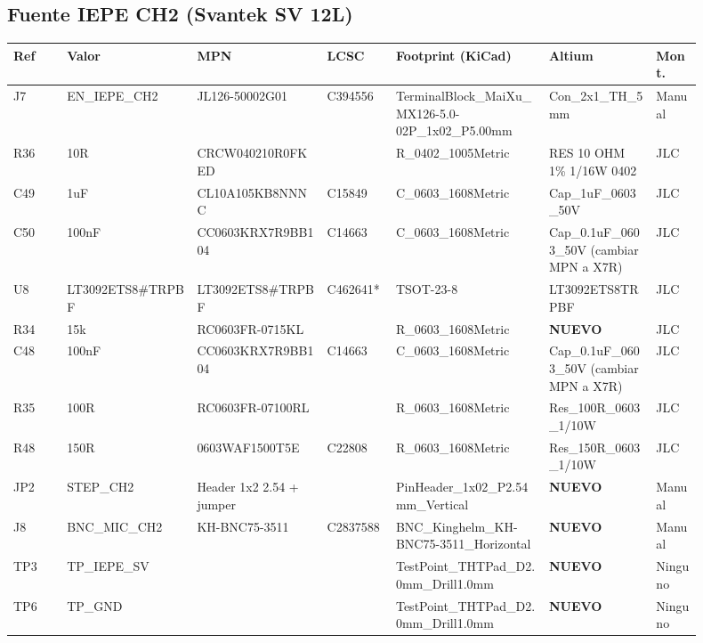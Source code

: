 \documentclass[10pt,a4paper]{article}
\begin{document}
\subsection*{Fuente IEPE CH2 (Svantek SV 12L)}
{\scriptsize\begin{longtable}{@{}L{0.07\linewidth}L{0.17\linewidth}L{0.17\linewidth}L{0.09\linewidth}L{0.20\linewidth}L{0.14\linewidth}L{0.06\linewidth}@{}}\toprule
\textbf{Ref} & \textbf{Valor} & \textbf{MPN} & \textbf{LCSC} & \textbf{Footprint (KiCad)} & \textbf{Altium} & \textbf{Mont.}\\\midrule\endhead
J7 & EN\_\allowbreak{}IEPE\_\allowbreak{}CH2 & JL126-50002G01 & C394556 & TerminalBlock\_\allowbreak{}MaiXu\_\allowbreak{}MX126-5.0-02P\_\allowbreak{}1x02\_\allowbreak{}P5.00mm & Con\_\allowbreak{}2x1\_\allowbreak{}TH\_\allowbreak{}5mm & Manual\\
R36 & 10R & CRCW040210R0FKED &  & R\_\allowbreak{}0402\_\allowbreak{}1005Metric & RES 10 OHM 1\% 1/16W 0402 & JLC\\
C49 & 1uF & CL10A105KB8NNNC & C15849 & C\_\allowbreak{}0603\_\allowbreak{}1608Metric & Cap\_\allowbreak{}1uF\_\allowbreak{}0603\_\allowbreak{}50V & JLC\\
C50 & 100nF & CC0603KRX7R9BB104 & C14663 & C\_\allowbreak{}0603\_\allowbreak{}1608Metric & Cap\_\allowbreak{}0.1uF\_\allowbreak{}0603\_\allowbreak{}50V (cambiar MPN a X7R) & JLC\\
U8 & LT3092ETS8\#TRPBF & LT3092ETS8\#TRPBF & C462641* & TSOT-23-8 & LT3092ETS8TRPBF & JLC\\
R34 & 15k & RC0603FR-0715KL &  & R\_\allowbreak{}0603\_\allowbreak{}1608Metric & \textbf{NUEVO} & JLC\\
C48 & 100nF & CC0603KRX7R9BB104 & C14663 & C\_\allowbreak{}0603\_\allowbreak{}1608Metric & Cap\_\allowbreak{}0.1uF\_\allowbreak{}0603\_\allowbreak{}50V (cambiar MPN a X7R) & JLC\\
R35 & 100R & RC0603FR-07100RL &  & R\_\allowbreak{}0603\_\allowbreak{}1608Metric & Res\_\allowbreak{}100R\_\allowbreak{}0603\_\allowbreak{}1/10W & JLC\\
R48 & 150R & 0603WAF1500T5E & C22808 & R\_\allowbreak{}0603\_\allowbreak{}1608Metric & Res\_\allowbreak{}150R\_\allowbreak{}0603\_\allowbreak{}1/10W & JLC\\
JP2 & STEP\_\allowbreak{}CH2 & Header 1x2 2.54 + jumper &  & PinHeader\_\allowbreak{}1x02\_\allowbreak{}P2.54mm\_\allowbreak{}Vertical & \textbf{NUEVO} & Manual\\
J8 & BNC\_\allowbreak{}MIC\_\allowbreak{}CH2 & KH-BNC75-3511 & C2837588 & BNC\_\allowbreak{}Kinghelm\_\allowbreak{}KH-BNC75-3511\_\allowbreak{}Horizontal & \textbf{NUEVO} & Manual\\
TP3 & TP\_\allowbreak{}IEPE\_\allowbreak{}SV &  &  & TestPoint\_\allowbreak{}THTPad\_\allowbreak{}D2.0mm\_\allowbreak{}Drill1.0mm & \textbf{NUEVO} & Ninguno\\
TP6 & TP\_\allowbreak{}GND &  &  & TestPoint\_\allowbreak{}THTPad\_\allowbreak{}D2.0mm\_\allowbreak{}Drill1.0mm & \textbf{NUEVO} & Ninguno\\
\bottomrule\end{longtable}}
\end{document}
